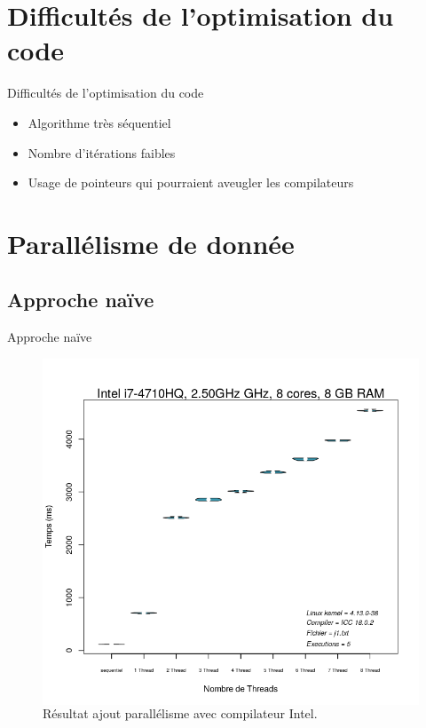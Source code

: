 \documentclass{beamer}
\begin{document}
\section{Difficultés de l'optimisation du code}

\begin{frame}{Difficultés de l'optimisation du code}
\begin{itemize}
\item
Algorithme très séquentiel
\item
Nombre d'itérations faibles
\item
Usage de pointeurs qui pourraient aveugler les compilateurs
\end{itemize}
\end{frame}

\section{Parallélisme de donnée}

\subsection{Approche naïve}
\begin{frame}{Approche naïve}
	\begin{figure}

	\begin{columns}
      \caption{Résultat ajout parallélisme avec compilateur Intel.\label{Fig:naif_intel}}
      \includegraphics[width=\textwidth]{intel_parallel_naif.png}
    \end{columns}	
   		
	\end{figure}
\end{frame}
\end{document}
